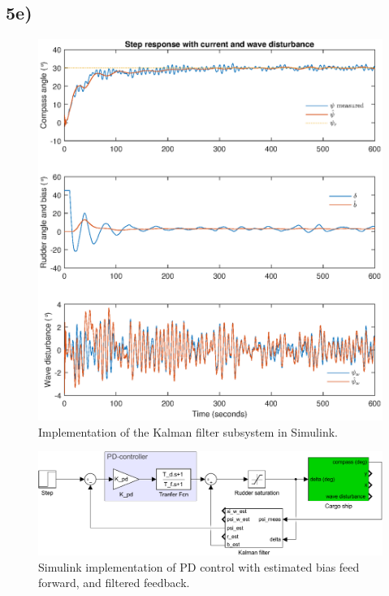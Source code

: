 \subsection{5e)}

\begin{figure}
    \centering
    \includegraphics[width=\textwidth]{images/oppg5/5e.eps}
    \caption{Implementation of the Kalman filter subsystem in Simulink.}
    \label{fig:kalman_subsys}
\end{figure}

\begin{figure}
    \centering
    \includegraphics[width=\textwidth]{images/oppg5/bias_FF_and_filtered_FB.pdf}
    \caption{Simulink implementation of PD control with estimated bias feed forward, and filtered feedback.}
    \label{fig:filtered_fb}
\end{figure}
